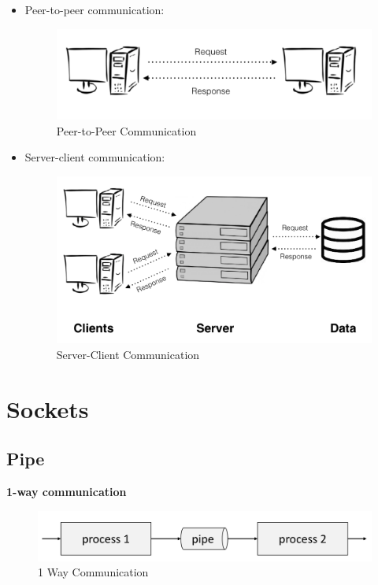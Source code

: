 \documentclass{article}
\begin{document}
\begin{itemize}
    \item Peer-to-peer communication:
    \begin{figure}[h]
        \centering
        \includegraphics[scale=0.5]{images/peer-to-peer.png}
        \caption{Peer-to-Peer Communication}
        \label{fig:my_label}
    \end{figure}
    \item Server-client communication:
    \begin{figure}[h]
        \centering
        \includegraphics[scale=0.45]{images/server-client.png}
        \caption{Server-Client Communication}
        \label{fig:my_label}
    \end{figure}
\end{itemize}


\section{Sockets}

\subsection{Pipe}

\textbf{1-way communication}

\begin{figure}[h]
    \centering
    \includegraphics[scale=0.3]{images/pipe-1-way-communication.png}
   \caption{1 Way Communication}
    \label{fig:my_label}
\end{figure}
\end{document}
